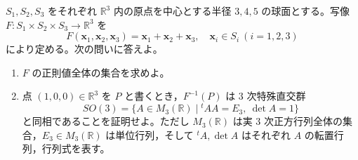 \documentclass[12pt]{jlreq}
\newcommand{\R}{\mathbb{R}}
\begin{document}
$S_1, S_2, S_3$ をそれぞれ $\R^3$ 内の原点を中心とする半径 $3, 4, 5$ の球面とする。写像 $F : S_1 \times S_2 \times S_3 \to \R^3$ を
\[
  F(\mathbf{x}_1, \mathbf{x}_2, \mathbf{x}_3) = \mathbf{x}_1 + \mathbf{x}_2 + \mathbf{x}_3,\quad \mathbf{x}_i \in S_i \ (i=1,2,3)
\]
により定める。次の問いに答えよ。

\begin{enumerate}
  \item $F$ の正則値全体の集合を求めよ。
  \item 点 $(1,0,0) \in \R^3$ を $P$ と書くとき，$F^{-1}(P)$ は $3$ 次特殊直交群
  \[
    SO(3) = \{ A \in M_3(\R) \mid {}^tAA = E_3,\ \det A = 1 \}
  \]
  と同相であることを証明せよ。ただし $M_3(\R)$ は実 $3$ 次正方行列全体の集合，$E_3 \in M_3(\R)$ は単位行列，そして ${}^tA, \det A$ はそれぞれ $A$ の転置行列，行列式を表す。
\end{enumerate}
\end{document}
